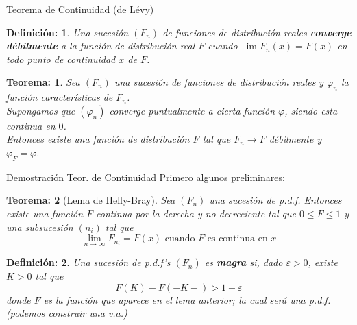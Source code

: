 \documentclass{beamer}
\newcommand{\vp}{\varphi}
\newtheorem{defi}{Definición:}
\newtheorem{teo}{Teorema:}
\begin{document}
\begin{frame}{Teorema de Continuidad (de Lévy)}
\begin{defi}
	Una sucesión $(F_{n})$ de funciones de distribución reales \textbf{converge débilmente} a la función de distribución real $F$ cuando $ \lim F_{n} (x) =F(x) $ en todo punto de continuidad $x $ de $F$.
\end{defi}

	\begin{teo} \label{cont}
		Sea $(F_{n})$ una sucesión de funciones de distribución reales y $\vp_{n}$ la función características de $F_{n}$. \\
		Supongamos que $(\vp_{n})$ converge puntualmente a cierta función $\vp$, siendo esta continua en $0$. \\
		Entonces existe una función de distribución $F$ tal que $F_{n} \longrightarrow F$ débilmente y $\vp_{F}=\vp $.
	\end{teo}

\end{frame}

\begin{frame}{Demostración Teor. de Continuidad}
	Primero algunos preliminares:
	\begin{teo}[Lema de Helly-Bray]
		Sea $ (F_{n}) $ una sucesión de p.d.f. Entonces existe una función $F$ continua por la derecha y no decreciente tal que $0 \leqslant F \leqslant 1 $ y una subsucesión $(n_{i})$ tal que $$ \lim _{n \rightarrow \infty} F_{n_{i}} = F(x) \mbox{ cuando } F \mbox{ es continua en }x $$
		
	\end{teo}

\begin{defi}
	Una sucesión de p.d.f's $(F_{n})$ es \textbf{magra} si, dado $\varepsilon > 0$, existe $K>0$ tal que $$ F(K)- F(-K-) >1- \varepsilon $$ donde $F$ es la función que aparece en el lema anterior; la cual será una p.d.f. (podemos construir una v.a.)
\end{defi}



\end{frame}
\end{document}
